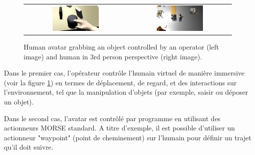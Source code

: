 \documentclass[a4paper,11pt,twoside]{StyleThese}
\begin{document}


\begin{figure}[ht!]
 \centering
 \begin{tabular}{cc}
  \includegraphics[width=0.475\textwidth]{img/Screenshot_from_2014-04-29_14_02_14.png} &
  \includegraphics[width=0.475\textwidth]{img/Screenshot_from_2014-04-29_14_21_24.png}
 \end{tabular}
 \caption{Human avatar grabbing an object controlled by an operator (left image) and human in 3rd person perspective (right image).}
 \label{fig:human_morse}
   \vspace{-3pt}
 \end{figure}

Dans le premier cas, l'opérateur contrôle l'humain virtuel de manière immersive (voir la figure \ref{fig:human_morse}) en termes de déplacement, de regard, et des interactions sur l'environnement, tel que la manipulation d'objets (par exemple, saisir ou déposer un objet).

Dans le second cas, l'avatar est contrôlé par programme en utilisant des actionneurs MORSE standard. A titre d'exemple, il est possible d'utiliser un actionneur "waypoint" (point de cheminement) sur l'humain pour définir un trajet qu'il doit suivre.
\end{document}
